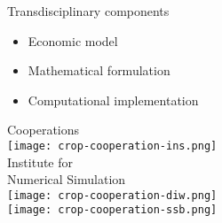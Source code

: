   \begin{frame}{Transdisciplinary components}

  \begin{itemize}\setlength\itemsep{1em}
  \item Economic model
  \item Mathematical formulation
  \item Computational implementation
  \end{itemize}
  \end{frame}
  \begin{frame}{Cooperations}
  	\centering \\  \vspace{0.5cm}
  	\texttt{[image: crop-cooperation-ins.png]} \\\vspace{-0.5cm}
  	\footnotesize{Institute for \\ Numerical Simulation}\vspace{0.3cm}   \\ \vspace{0.5cm}
  	\texttt{[image: crop-cooperation-diw.png]} \\ \vspace{0.5cm}
  	\texttt{[image: crop-cooperation-ssb.png]} \\
%  		
%  	
%  	
  \end{frame}
